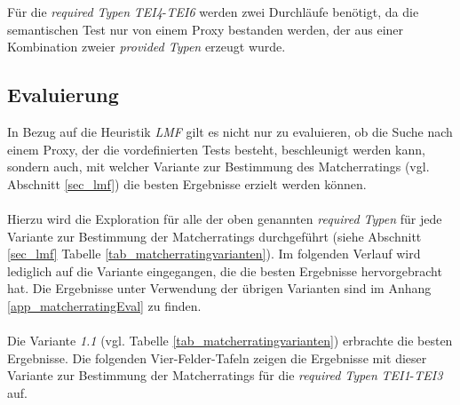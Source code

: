 \begin{multicols}{3}
\columnbreak
{}\columnbreak
{}
\end{multicols}
\noindent
Für die \emph{required Typen} \emph{TEI4}-\emph{TEI6} werden zwei Durchläufe benötigt, da die semantischen Test nur von einem Proxy bestanden werden, der aus einer Kombination zweier \emph{provided Typen} erzeugt wurde.

\subsection{Evaluierung}\label{sec_evalLMF}
In Bezug auf die Heuristik \emph{LMF} gilt es nicht nur zu evaluieren, ob die Suche nach einem Proxy, der die vordefinierten Tests besteht, beschleunigt werden kann, sondern auch, mit welcher Variante zur Bestimmung des Matcherratings (vgl. Abschnitt \ref{sec_lmf}) die besten Ergebnisse erzielt werden können. 
\\\\
Hierzu wird die Exploration für alle der oben genannten \emph{required Typen} für jede Variante zur Bestimmung der Matcherratings durchgeführt (siehe Abschnitt \ref{sec_lmf} Tabelle \ref{tab_matcherratingvarianten}). Im folgenden Verlauf wird lediglich auf die Variante eingegangen, die die besten Ergebnisse hervorgebracht hat. Die Ergebnisse unter Verwendung der übrigen Varianten sind im Anhang \ref{app_matcherratingEval} zu finden.
\\\\
Die Variante \emph{1.1} (vgl. Tabelle \ref{tab_matcherratingvarianten}) erbrachte die besten Ergebnisse. Die folgenden Vier-Felder-Tafeln zeigen die Ergebnisse mit dieser Variante zur Bestimmung der Matcherratings für die \emph{required Typen} \emph{TEI1}-\emph{TEI3} auf.
\begin{multicols}{3}
\columnbreak
{}\columnbreak
{}
\end{multicols}
